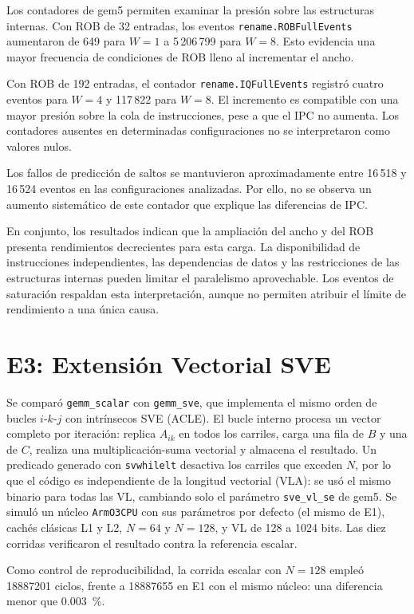 \documentclass[journal]{IEEEtran}
\begin{document}
Los contadores de gem5 permiten examinar la presión
sobre las estructuras internas. Con ROB de 32
entradas, los eventos
\texttt{rename.ROBFullEvents} aumentaron de
649 para $W=1$ a 5\,206\,799 para $W=8$.
Esto evidencia una mayor frecuencia de condiciones
de ROB lleno al incrementar el ancho.

Con ROB de 192 entradas, el contador
\texttt{rename.IQFullEvents} registró cuatro
eventos para $W=4$ y 117\,822 para $W=8$.
El incremento es compatible con una mayor
presión sobre la cola de instrucciones, pese
a que el IPC no aumenta. Los contadores
ausentes en determinadas configuraciones
no se interpretaron como valores nulos.

Los fallos de predicción de saltos se mantuvieron
aproximadamente entre 16\,518 y 16\,524 eventos
en las configuraciones analizadas. Por ello,
no se observa un aumento sistemático de este
contador que explique las diferencias de IPC.

En conjunto, los resultados indican que la
ampliación del ancho y del ROB presenta
rendimientos decrecientes para esta carga.
La disponibilidad de instrucciones independientes,
las dependencias de datos y las restricciones
de las estructuras internas pueden limitar
el paralelismo aprovechable. Los eventos de
saturación respaldan esta interpretación,
aunque no permiten atribuir el límite de
rendimiento a una única causa.

\section{E3: Extensión Vectorial SVE}
\label{sec:e3}

Se comparó \texttt{gemm\_scalar} con \texttt{gemm\_sve}, que implementa
el mismo orden de bucles $i$-$k$-$j$ con intrínsecos SVE (ACLE). El
bucle interno procesa un vector completo por iteración: replica
$A_{ik}$ en todos los carriles, carga una fila de $B$ y una de $C$,
realiza una multiplicación-suma vectorial y almacena el resultado.
Un predicado generado con \texttt{svwhilelt} desactiva los carriles que
exceden $N$, por lo que el código es independiente de la longitud
vectorial (VLA): se usó el mismo binario para todas las VL, cambiando
solo el parámetro \texttt{sve\_vl\_se} de gem5. Se simuló un núcleo
\texttt{ArmO3CPU} con sus parámetros por defecto (el mismo de E1),
cachés clásicas L1 y L2, $N=64$ y $N=128$, y VL de 128 a 1024 bits.
Las diez corridas verificaron el resultado contra la referencia escalar.

Como control de reproducibilidad, la corrida escalar con $N=128$ empleó
\num{18887201} ciclos, frente a \num{18887655} en E1 con el mismo
núcleo: una diferencia menor que \SI{0,003}{\percent}.
\end{document}

